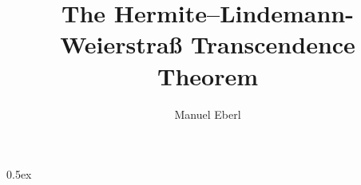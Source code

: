 \documentclass[11pt,a4paper]{article}
\begin{document}
\title{The Hermite--Lindemann-Weierstraß Transcendence Theorem}
\author{Manuel Eberl}
\maketitle

\begin{abstract}

\end{abstract}

\newpage
\tableofcontents
\newpage
\parindent 0pt\parskip 0.5ex



\nocite{baker}
\nocite{redheffer_steinberg}
\nocite{bernard}



\end{document}
